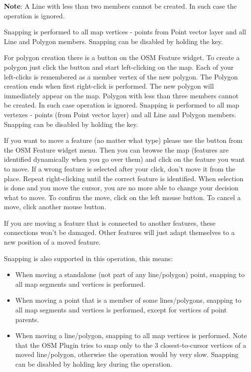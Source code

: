 \textbf{Note}: A Line with less than two members cannot be created. In
such case the operation is ignored.

Snapping is performed to all map vertices - points from Point vector layer
and all Line and Polygon members. Snapping can be disabled by holding the
 key.


For polygon creation there is a 
button on the OSM Feature widget. To create a polygon just click the button
and start left-clicking on the map. Each of your left-clicks is remembered as
a member vertex of the new polygon. The Polygon creation ends when first
right-click is performed. The new polygon will immediately appear on the map.
Polygon with less than three members cannot be created. In such case
operation is ignored. Snapping is performed to all map vertexes - points
(from Point vector layer) and all Line and Polygon members. Snapping can be
disabled by holding the  key.


If you want to move a feature (no matter what type) please use the
 button from the OSM Feature widget menu.
Then you can browse the map (features are identified dynamically when you
go over them) and click on the feature you want to move. If a wrong feature is
selected after your click, don't move it from the place. Repeat right-clicking
until the correct feature is identified. When selection is done and you move
the cursor, you are no more able to change your decision what to move.
To confirm the move, click on the left mouse button. To cancel a move, click
another mouse button.

If you are moving a feature that is connected to another features, these
connections won't be damaged. Other features will just adapt themselves to
a new position of a moved feature.

Snapping is also supported in this operation, this means:

\begin{itemize}[label=--]
\item When moving a standalone (not part of any line/polygon) point,
snapping to all map segments and vertices is performed.
\item When moving a point that is a member of some lines/polygons,
snapping to all map segments and vertices is performed, except for
vertices of point parents.
\item When moving a line/polygon, snapping to all map vertices is performed.
Note that the OSM Plugin tries to snap only to the 3 closest-to-cursor
vertices of a moved line/polygon, otherwise the operation would by very slow.
Snapping can be disabled by holding  key during the operation.
\end{itemize}

